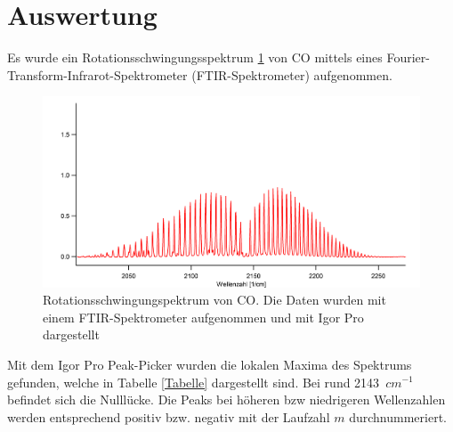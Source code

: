 %
%
\section {Auswertung}

Es wurde ein Rotationsschwingungsspektrum \ref{Spektrum} von CO mittels eines Fourier-Transform-Infrarot-Spektrometer (FTIR-Spektrometer) aufgenommen.

\begin{figure}[H]
	\centering	
	\begin{minipage}{1\textwidth}
		\includegraphics[width=\columnwidth]{Bilder/Graph_spektrum.png}
	\end{minipage}
	\caption{Rotationsschwingungspektrum von CO. Die Daten wurden mit einem FTIR-Spektrometer aufgenommen und mit Igor Pro dargestellt }
	\label{Spektrum}
\end{figure}
Mit dem Igor Pro Peak-Picker wurden die lokalen Maxima des Spektrums gefunden, welche in Tabelle \ref{Tabelle} dargestellt sind. Bei rund 2143~$cm^{-1}$ befindet sich die Nulllücke. Die Peaks bei höheren bzw niedrigeren Wellenzahlen werden entsprechend positiv bzw. negativ mit der Laufzahl $m$ durchnummeriert.

